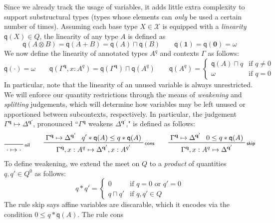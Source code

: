 \documentclass[acmsmall,screen,review]{acmart}
\newcommand{\mc}[1]{\ensuremath{\mathcal{#1}}}
\newcommand{\mb}[1]{\ensuremath{\mathbf{#1}}}
\newcommand{\ms}[1]{\ensuremath{\mathsf{#1}}}
\newcommand{\cwk}[2]{#1 \mapsto #2}
\newcommand{\rle}[1]{{\scriptsize\textsf{#1}}}
\newcommand{\brle}[1]{{\textsf{#1}}}
\newcommand{\zeroq}{0}
\newcommand{\topq}{\omega}
\newcommand{\alquant}{\ms{q}}
\begin{document}
  Since we already track the usage of variables, it adds little extra
complexity to support substructural types (types whose elements can \emph{only} be used a
certain number of times). Assuming each base type $X \in \mc{X}$ is
equipped with a \emph{linearity} $\alquant(X) \in Q$, the linearity of any type $A$ is defined as
\begin{equation}
  \alquant(A \otimes B) = \alquant(A + B) = \alquant(A) \sqcap \alquant(B) \qquad
  \alquant(\mb{1}) = \alquant(\mb{0}) = \topq
\end{equation}
We now define the linearity of annotated types $A^q$ and contexts $\Gamma$ as follows:
\begin{equation}
  \alquant(\cdot) = \topq \qquad
  \alquant(\Gamma^{\mb{q}}, x : A^q) 
    = \alquant(\Gamma^{\mb{q}}) \sqcap \alquant(A^q) \qquad 
  \alquant(A^q) = \begin{cases}
    \alquant(A) \sqcap q & \text{if } q \neq 0 \\
    \topq & \text{if } q = 0
  \end{cases}
\end{equation}
In particular, note that the linearity of an unused variable is always unrestricted.
%
We will enforce our quantity restrictions through the means of \emph{weakening} and \emph{splitting}
judgements, which will determine how variables may be left unused or apportioned between
subcontexts, respectively. In particular, the judgement $\cwk{\Gamma^{\mb{q}}}{\Delta^{\mb{q}'}}$,
pronounced ``$\Gamma^{\mb{q}}$ weakens $\Delta^{\mb{q'}}$," is defined as follows:
\begin{gather*}
  \prftree[r]{\rle{nil}}{\cwk{\cdot}{\cdot}} \qquad 
  \prftree[r]{\rle{cons}}
    {\cwk{\Gamma^{\mb{q}}}{\Delta^{\mb{q}'}}}
    {q' * \alquant(A) \leq q * \alquant(A)}
    {\cwk{\Gamma^{\mb{q}}, x : A^q}
         {\Delta^{\mb{q}'}, x : A^{q'}}} \qquad
  \prftree[r]{\rle{skip}}
    {\cwk{\Gamma^{\mb{q}}}{\Delta^{\mb{q}'}}}
    {\zeroq \leq q * \alquant(A)}
    {\cwk{\Gamma^{\mb{q}}, x : A^q}{\Delta}^{\mb{q}'}}
\end{gather*}
To define weakening, we extend the meet on $Q$ to a \emph{product} of quantities $q, q' \in Q^0$ as follows:
\begin{equation}
  q * q' = \begin{cases}
    0 & \text{if } q = 0 \text{ or } q' = 0 \\
    q \sqcap q' & \text{if } q, q' \in Q
  \end{cases}
\end{equation}
The rule \brle{skip} says affine variables are discarable, which it encodes via the condition $\zeroq \leq q * \alquant(A)$.  The rule \brle{cons}
\end{document}
